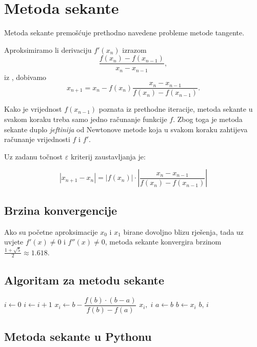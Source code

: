 \section{Metoda sekante}

Metoda sekante premošćuje prethodno navedene probleme metode tangente.

Aproksimiramo li derivaciju $f'(x_n)$ izrazom
$$
\dfrac{f(x_n)-f(x_{n-1})}{x_n - x_{n-1}},
$$
iz , dobivamo
$$
x_{n+1} = x_n - f(x_n)\dfrac{x_n-x_{n-1}}{f(x_n)-f(x_{n-1})}.
$$

Kako je vrijednost $f(x_{n-1})$ poznata iz prethodne iteracije, metoda sekante u
svakom koraku treba samo jedno računanje funkcije $f$. Zbog toga je metoda
sekante duplo \textit{jeftinija} od Newtonove metode koja u svakom koraku
zahtijeva računanje vrijednosti $f$ i $f'$.

Uz zadanu točnost $\varepsilon$ kriterij zaustavljanja je:

$$
|x_{n+1}-x_n| = |f(x_n)|\cdot\left|\frac{x_n-x_{n-1}}{f(x_n)-f(x_{n-1})}\right|
$$

\subsection{Brzina konvergencije}

Ako su početne aproksimacije $x_0$ i $x_1$ birane dovoljno blizu rješenja, tada
uz uvjete $f'(x)\neq 0$ i $f''(x)\neq 0$, metoda sekante konvergira brzinom
$\frac{1+\sqrt{5}}{2}\approx 1.618$.

\begin{multicols}{2}

\subsection{Algoritam za metodu sekante}

\begin{algorithmic}
    \State $i \gets 0$
        \State $i \gets i + 1$
        \State $x_i \gets b - \dfrac{f(b) \cdot (b - a)}{f(b) - f(a)}$
            \State \Return $x_i,\;i$ 
        \Else
            \State $a \gets b$
            \State $b \gets x_i$
        \EndIf
        \EndIf
    \EndWhile
    \State \Return $b,\,i$
\EndFunction
\end{algorithmic}

\columnbreak

\subsection{Metoda sekante u Pythonu}

\begingroup
\makeatletter
\@totalleftmargin=-1cm

\endgroup

\end{multicols}
